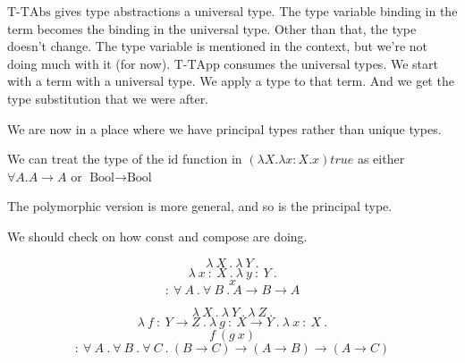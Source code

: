 \begin{frame}
\begin{mdframed}[frametitle={Typing rules (new)}]
\begin{overprint}
  \end{overprint}

  \end{mdframed}

  \medskip

  \begin{overprint}
    $\text{T-TAbs}$ gives type abstractions a universal type.
    The type variable binding in the term becomes the binding in the universal type.
    Other than that, the type doesn't change.
    The type variable is mentioned in the context, but we're not doing much with
    it (for now).
    $\text{T-TApp}$ consumes the universal types.
    We start with a term with a universal type.
    We apply a type to that term.
    And we get the type substitution that we were after.
  \end{overprint}
\end{frame}

\begin{frame}
  We are now in a place where we have principal types rather than unique types.
\end{frame}

\begin{frame}
  We can treat the type of the $\text{id}$ function in $(\lambda X . \lambda x
  {:} X . x) true$ as either $\forall A . A \rightarrow A$ or $\text{Bool}
  \rightarrow \text{Bool} $
\end{frame}

\begin{frame}
  The polymorphic version is more general, and so is the principal type.
\end{frame}

\begin{frame}
  We should check on how $\text{const}$ and $\text{compose}$ are doing.
\end{frame}

\begin{frame}
  \[\lambda~X~.~\lambda~Y~.\]
  \[\lambda~x~{:}~X~.~\lambda~y~{:}~Y~.\]
  \[x\]
  \[{:}~\forall~A~.~\forall~B~.~A \rightarrow B \rightarrow A\]
\end{frame}

\begin{frame}
    \[\lambda~X~.~\lambda~Y~.~\lambda~Z~.\]
    \[\lambda~f~{:}~Y \rightarrow Z~.~\lambda~g~{:}~X \rightarrow Y~.~\lambda~x~{:}~X~.\]
    \[f~\left( g~x \right)\]
    \[{:}~\forall~A~.~\forall~B~.~\forall~C~.~\left( B \rightarrow C \right) \rightarrow \left( A \rightarrow B \right) \rightarrow \left( A \rightarrow C \right)\]
\end{frame}


